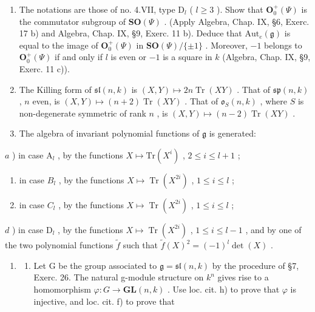 \begin{enumerate}
\def\labelenumi{\arabic{enumi})}
\setcounter{enumi}{10}
\item
  The notations are those of no. 4.VII, type \(\mathrm{D}_l\) ( \(l \geq 3\) ). Show that \(\mathbf{O}_0^+(\varPsi)\) is the commutator subgroup of \(\mathbf{SO}(\varPsi)\) . (Apply Algebra, Chap. IX, §6, Exerc. 17 b) and Algebra, Chap. IX, §9, Exerc. 11 b). Deduce that \(\mathrm{Aut}_e(\mathfrak{g})\) is equal to the image of \(\mathbf{O}_0^+(\varPsi)\) in \(\mathbf{SO}(\varPsi)/\{\pm 1\}\) . Moreover, \(-1\) belongs to \(\mathbf{O}_0^+(\varPsi)\) if and only if \(l\) is even or \(-1\) is a square in \(k\) (Algebra, Chap. IX, §9, Exerc. 11 c)).
\item
  The Killing form of \(\mathfrak{sl}(n,k)\) is \((X,Y)\mapsto 2n\operatorname {Tr}(XY)\) . That of \(\mathfrak{sp}(n,k)\) , \(n\) even, is \((X,Y)\mapsto (n + 2)\operatorname {Tr}(XY)\) . That of \(\mathfrak{o}_S(n,k)\) , where \(S\) is non-degenerate symmetric of rank \(n\) , is \((X,Y)\mapsto (n - 2)\operatorname {Tr}(XY)\) .
\item
  The algebra of invariant polynomial functions of \(\mathfrak{g}\) is generated:
\end{enumerate}

\(a\) ) in case \(\mathrm{A}_l\) , by the functions \(X\mapsto \mathrm{Tr}(X^i)\) , \(2\leq i\leq l + 1\) ;

\begin{enumerate}
\def\labelenumi{\alph{enumi})}
\setcounter{enumi}{1}
\item
  in case \(B_{l}\) , by the functions \(X \mapsto \operatorname{Tr}(X^{2i})\) , \(1 \leq i \leq l\) ;
\item
  in case \(C_{l}\) , by the functions \(X \mapsto \operatorname{Tr}(X^{2i})\) , \(1 \leq i \leq l\) ;
\end{enumerate}

\(d\) ) in case \(\mathrm{D}_l\) , by the functions \(X \mapsto \operatorname{Tr}(X^{2i})\) , \(1 \leq i \leq l - 1\) , and by one of the two polynomial functions \(\tilde{f}\) such that \(\tilde{f}(X)^2 = (-1)^l \det(X)\) .

\begin{enumerate}
\def\labelenumi{\arabic{enumi})}
\setcounter{enumi}{13}
\tightlist
\item
  \begin{enumerate}
  \def\labelenumii{\alph{enumii})}
  \tightlist
  \item
    Let G be the group associated to \(\mathfrak{g} = \mathfrak{sl}(n, k)\) by the procedure of §7, Exerc. 26. The natural g-module structure on \(k^{n}\) gives rise to a homomorphism \(\varphi : G \to \mathbf{GL}(n, k)\) . Use loc. cit. h) to prove that \(\varphi\) is injective, and loc. cit. f) to prove that
  \end{enumerate}
\end{enumerate}


